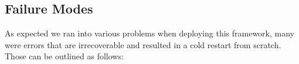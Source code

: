 \documentclass[conference,final]{IEEEtran}
\newcommand{\jha}[0]{}
\begin{document}





\subsection{Failure Modes}
As expected we ran into various problems when deploying this
framework, many were errors that are irrecoverable and resulted in a
cold restart from scratch. Those can be outlined as follows:
\end{document}
